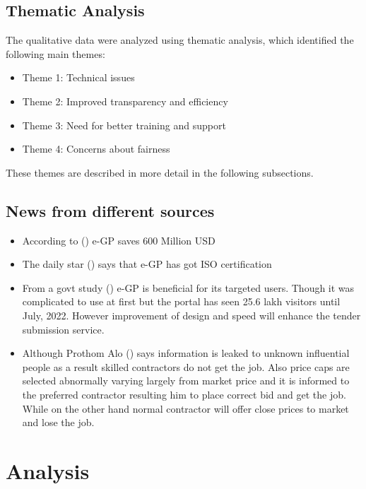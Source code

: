 \documentclass{report}
\begin{document}
\subsection{Thematic Analysis}

The qualitative data were analyzed using thematic analysis, which identified the following main themes:

\begin{itemize}
    \item Theme 1: Technical issues
    \item Theme 2: Improved transparency and efficiency
    \item Theme 3: Need for better training and support
    \item Theme 4: Concerns about fairness
\end{itemize}

These themes are described in more detail in the following subsections.


\subsection{News from different sources}
\begin{itemize}
    \item According to (\cite{Tfex}) e-GP saves  600 Million USD
    \item The daily star (\cite{TDS}) says that e-GP has got ISO certification
    \item From a govt study (\cite{TDS1}) e-GP is beneficial for its targeted users. Though it was complicated to use at first but the portal has seen 25.6 lakh visitors until July, 2022. However improvement of design and speed will enhance the tender submission service.
    \item Although Prothom Alo (\cite{TPA}) says information is leaked to unknown influential people as a result skilled contractors do not get the job. Also price caps are selected abnormally varying largely from market price and it is informed to the preferred contractor resulting him to place correct bid and get the job. While on the other hand normal contractor will offer close prices to market and lose the job.
    
\end{itemize}
  



\section{Analysis}
\end{document}
